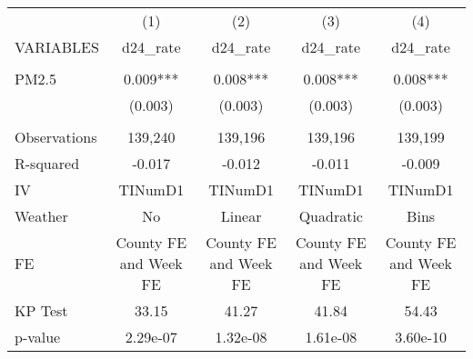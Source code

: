 \begin{tabular}{lcccc} \hline
 & (1) & (2) & (3) & (4) \\
VARIABLES & d24\_rate & d24\_rate & d24\_rate & d24\_rate \\ \hline
 &  &  &  &  \\
PM2.5 & 0.009*** & 0.008*** & 0.008*** & 0.008*** \\
 & (0.003) & (0.003) & (0.003) & (0.003) \\
 &  &  &  &  \\
Observations & 139,240 & 139,196 & 139,196 & 139,199 \\
R-squared & -0.017 & -0.012 & -0.011 & -0.009 \\
IV & TINumD1 & TINumD1 & TINumD1 & TINumD1 \\
Weather & No & Linear & Quadratic & Bins \\
FE & County FE and Week FE & County FE and Week FE & County FE and Week FE & County FE and Week FE \\
KP Test & 33.15 & 41.27 & 41.84 & 54.43 \\
 p-value & 2.29e-07 & 1.32e-08 & 1.61e-08 & 3.60e-10 \\ \hline
\end{tabular}
